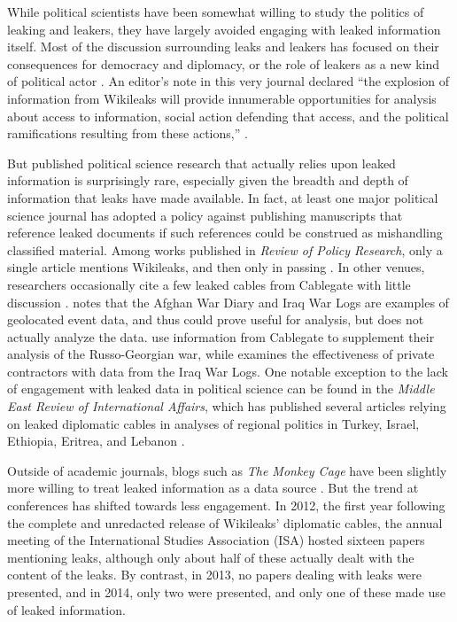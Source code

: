 \documentclass[12pt]{article}
\begin{document}
While political scientists have been somewhat willing to study the politics of leaking and leakers, 
they have largely avoided engaging with leaked information itself.
Most of the discussion surrounding leaks and leakers has focused on 
their consequences for democracy and diplomacy, or the role of 
leakers as a new kind of political actor \citep{simmons2011international,
davis2012political,pieterse2012leaking,springer2012leaky,
wong2013e-bandits}. An editor's note in this very journal declared ``the explosion of information 
from Wikileaks will provide innumerable opportunities for analysis about access to information, social action 
defending that access, and the political ramifications resulting from these actions,'' \citep[123]{gore2011editors}.

But published political science research that actually relies upon leaked information is surprisingly rare, especially given the breadth and depth of information that leaks have made 
available. 
In fact, at least one major political science journal has adopted a policy against 
publishing manuscripts that reference leaked documents if such references 
could be construed as mishandling classified material. 
Among works published in \textit{Review of Policy Research}, only a single article mentions Wikileaks, and then only in passing \citep{kingiri2012role}.
In other venues, researchers occasionally cite a few leaked cables from 
Cablegate with little discussion \citep{bowen2011irans,guliyev2012political}.
\citet{schrodt2012precedents} notes that the Afghan War Diary and Iraq War Logs are examples of 
geolocated event data, and thus could prove useful for analysis, but does not actually analyze the 
data.
\citet{mouritzen2012explaining} use information from Cablegate to supplement their analysis of the 
Russo-Georgian war, while
\citet{petersohn2013effectiveness} examines the effectiveness of private contractors with data from the 
Iraq War Logs. 
One notable exception to the lack of engagement with leaked data in political science 
can be found in the \emph{Middle East Review of International Affairs}, which has published several 
articles relying on leaked diplomatic cables in analyses of regional politics in Turkey, Israel, 
Ethiopia, Eritrea, and Lebanon \citep{altiparmak2011wikileaks,
spyer2011israel,lefebvre2012choosing,smyth2011``independent}.

Outside of academic journals, blogs such as \textit{The Monkey Cage} have been slightly more willing 
to treat leaked information as a data source \citep{voeten2010wikileaks,michael2013united}.
But the trend at conferences has shifted towards less engagement. In 2012, the first year following the 
complete and unredacted release of Wikileaks' diplomatic cables, the annual meeting of the International Studies 
Association (ISA) hosted sixteen papers mentioning leaks, although only about half of these actually dealt 
with the content of the leaks. By contrast, in 2013, no papers dealing with leaks were presented, and in 2014, 
only two were presented, and only one of these made use of leaked information.
\end{document}
